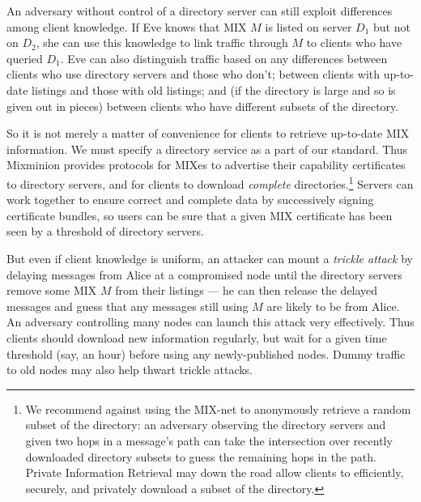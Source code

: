 \documentclass[11pt]{IEEEtran}
\begin{document}
An adversary without control of a directory server can still exploit
differences among client knowledge. If Eve knows that MIX $M$ is listed
on server $D_1$ but not on $D_2$, she can use this knowledge to link
traffic through $M$ to clients who have queried $D_1$.  Eve can also
distinguish traffic based on any differences between clients who use
directory servers and those who don't; between clients with up-to-date
listings and those with old listings; and (if the directory is large
and so is given out in pieces) between clients who have different subsets
of the directory.

So it is not merely a matter of convenience for clients to retrieve
up-to-date MIX information.
We must specify a directory
service as a part of our standard. Thus Mixminion provides protocols for
MIXes to advertise their capability certificates to directory servers,
and for clients to download \emph{complete} directories.\footnote{
  We recommend against using the MIX-net to anonymously retrieve a random
  subset of the directory: an adversary observing the directory servers
  and given two hops in a message's path can take the intersection over
  recently downloaded directory subsets to guess the remaining hops in
  the path. Private Information Retrieval \cite{malkin-thesis} may down
  the road allow clients to efficiently, securely, and privately download
  a subset of the directory.
}
Servers can work together to ensure correct and complete data by
successively signing certificate bundles, so users can be sure that a
given MIX certificate has been seen by a threshold of directory servers.

But even if client knowledge is uniform, an attacker can mount a
\emph{trickle attack} by delaying messages from Alice at a compromised
node until the directory servers remove some MIX $M$ from their listings
--- he can then release the delayed messages and guess that any messages
still using $M$ are likely to be from Alice. An adversary controlling
many nodes can launch this attack very effectively. Thus clients
should download new information regularly,
but wait for a given time threshold (say, an hour) before using any
newly-published nodes. Dummy traffic to old nodes may also 
help thwart trickle attacks.
\end{document}
